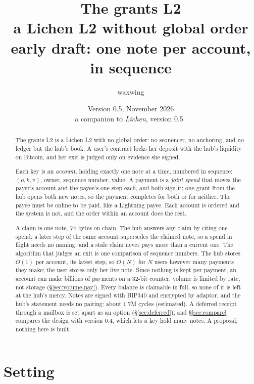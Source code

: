 \documentclass[11pt]{article}
\title{\textbf{The grants L2}\\a Lichen L2 without global order\\[2pt]\large early draft: one note per account, in sequence}
\author{waxwing}
\date{Version 0.5, November 2026\\[2pt]\small a companion to \emph{Lichen}, version 0.5~\cite{lichen}}
\theoremstyle{plain}
\theoremstyle{definition}
\begin{document}
\maketitle

\begin{abstract}
The grants L2 is a Lichen L2 with no global order: no sequencer, no
anchoring, and no ledger but the hub's book. A user's contract locks her
deposit with the hub's liquidity on Bitcoin, and her exit is judged
only on evidence she signed.

Each key is an \emph{account}, holding exactly one note at a time,
numbered in sequence: $(o, k, v)$, owner, sequence number, value. A
payment is a \emph{joint spend} that moves the payer's account and the
payee's one step each, and both sign it; one grant from the hub opens
both new notes, so the payment completes for both or for neither. The
payee must be online to be paid, like a Lightning payee. Each account is
ordered and the system is not, and the order within an account does the
rest.

A claim is one note, 74 bytes on chain. The hub answers any claim by
citing one spend: a later step of the same account supersedes the
claimed note, so a spend in flight needs no naming, and a stale claim
never pays more than a current one. The algorithm that judges an exit is
one comparison of sequence numbers. The hub stores $O(1)$ per account,
its latest step, so $O(N)$ for $N$ users however many payments they
make; the user stores only her live note. Since nothing is kept per
payment, an account can make billions of payments on a 32-bit counter:
volume is limited by rate, not storage (\S\ref{sec:volume-pay}). Every
balance is claimable in full, so none of it is left at the hub's mercy.
Notes are signed with BIP340 and encrypted by adaptor, and the hub's
statement needs no pairing: about 1.7M cycles (estimated). A deferred
receipt through a mailbox is set apart as an option
(\S\ref{sec:deferred}), and \S\ref{sec:compare} compares the design with
version 0.4, which lets a key hold many notes. A proposal; nothing here
is built.
\end{abstract}

\tableofcontents

\section{Setting}\label{sec:setting}
\end{document}
